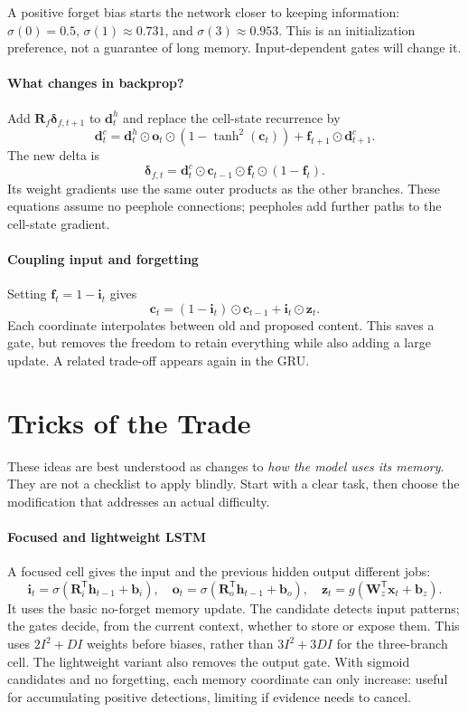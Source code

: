 \documentclass[11pt, oneside]{book}
\newcommand{\T}{^{\mathsf{T}}}           %
\let\originalsection\section
\renewcommand{\section}{\Needspace{7\baselineskip}\originalsection}
\begin{document}
A positive forget bias starts the network closer to keeping information: $\sigma(0)=0.5$, $\sigma(1)\approx0.731$, and $\sigma(3)\approx0.953$. This is an initialization preference, not a guarantee of long memory. Input-dependent gates will change it.

\paragraph{What changes in backprop?} Add $\mathbf{R}_f\boldsymbol{\delta}_{f,t+1}$ to $\mathbf{d}^h_t$ and replace the cell-state recurrence by
\[
 \mathbf{d}^c_t=\mathbf{d}^h_t\odot\mathbf{o}_t\odot(1-\tanh^2(\mathbf{c}_t))
       +\mathbf{f}_{t+1}\odot\mathbf{d}^c_{t+1}.
\]
The new delta is
\[
 \boldsymbol{\delta}_{f,t}=\mathbf{d}^c_t\odot\mathbf{c}_{t-1}
                             \odot\mathbf{f}_t\odot(1-\mathbf{f}_t).
\]
Its weight gradients use the same outer products as the other branches. These equations assume no peephole connections; peepholes add further paths to the cell-state gradient.

\paragraph{Coupling input and forgetting} Setting $\mathbf{f}_t=1-\mathbf{i}_t$ gives
\[
 \mathbf{c}_t=(1-\mathbf{i}_t)\odot\mathbf{c}_{t-1}+\mathbf{i}_t\odot\mathbf{z}_t.
\]
Each coordinate interpolates between old and proposed content. This saves a gate, but removes the freedom to retain everything while also adding a large update. A related trade-off appears again in the GRU.

\section{Tricks of the Trade}\label{sec:source-3-3}
These ideas are best understood as changes to \emph{how the model uses its memory}. They are not a checklist to apply blindly. Start with a clear task, then choose the modification that addresses an actual difficulty.

\paragraph{Focused and lightweight LSTM} A focused cell gives the input and the previous hidden output different jobs:
\[
 \mathbf{i}_t=\sigma(\mathbf{R}_i\T\mathbf{h}_{t-1}+\mathbf{b}_i),\quad
 \mathbf{o}_t=\sigma(\mathbf{R}_o\T\mathbf{h}_{t-1}+\mathbf{b}_o),\quad
 \mathbf{z}_t=g(\mathbf{W}_z\T\mathbf{x}_t+\mathbf{b}_z).
\]
It uses the basic no-forget memory update. The candidate detects input patterns; the gates decide, from the current context, whether to store or expose them. This uses $2I^2+DI$ weights before biases, rather than $3I^2+3DI$ for the three-branch cell. The lightweight variant also removes the output gate. With sigmoid candidates and no forgetting, each memory coordinate can only increase: useful for accumulating positive detections, limiting if evidence needs to cancel.
\end{document}
